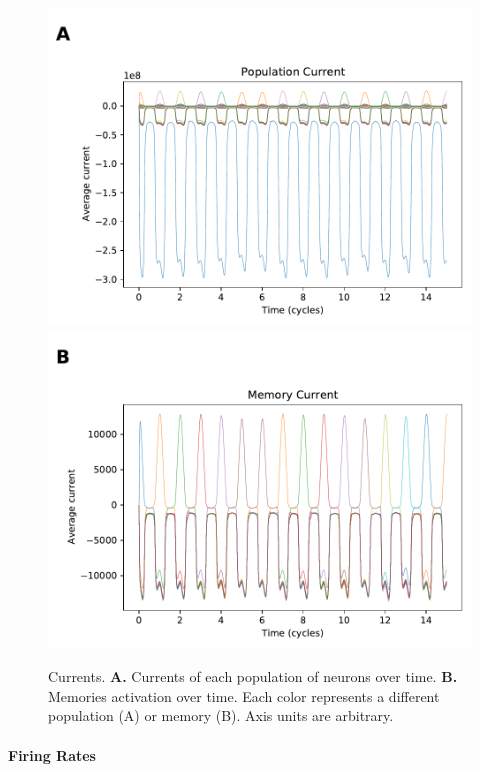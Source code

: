     \begin{figure}
        \includegraphics[width=\textwidth]{graphics/currents_populations.pdf}
        \includegraphics[width=\textwidth]{graphics/currents_memories.pdf}
        \caption{
        Currents.
        \textbf{A.} Currents of each population of neurons over time.
        \textbf{B.} Memories activation over time.
        Each color represents a different population (A) or memory (B).
        Axis units are arbitrary.
        }
        \label{fig:currents}
    \end{figure}
    
    \paragraph{Firing Rates}

